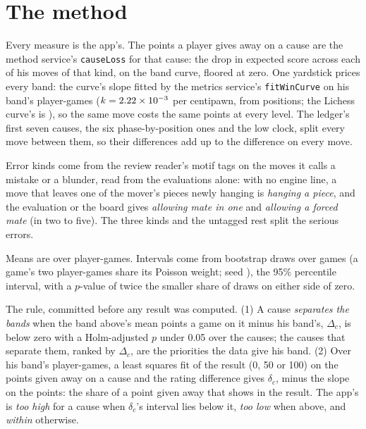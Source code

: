 \documentclass[11pt]{article}
\begin{document}
\begin{table}[h]
\centering
\small\BandTable
\caption{The bands. The slope is the band curve's, fitted on the band's own player-games; plies
are a game's mean length.}
\label{tab:bands}
\end{table}

\section{The method}

Every measure is the app's. The points a player gives away on a cause are the method service's
\texttt{causeLoss} for that cause: the drop in expected score across each of his moves of that
kind, on the band curve, floored at zero. One yardstick prices every band: the curve's slope fitted
by the metrics service's \texttt{fitWinCurve} on his band's player-games ($k = 2.22 \times
10^{-3}$ per centipawn, from \YardstickPositions{} positions; the Lichess curve's is \LichessK),
so the same move costs the same points at every level. The ledger's first seven causes, the six
phase-by-position ones and the low clock, split every move between them, so their differences add
up to the difference on every move.

Error kinds come from the review reader's motif tags on the moves it calls a mistake or a blunder,
read from the evaluations alone: with no engine line, a move that leaves one of the mover's pieces
newly hanging is \emph{hanging a piece}, and the evaluation or the board gives \emph{allowing mate in
one} and \emph{allowing a forced mate} (in two to five). The three kinds and the untagged rest split
the serious errors.

Means are over player-games. Intervals come from \Draws{} bootstrap draws over games (a game's two
player-games share its Poisson weight; seed \Seed), the 95\% percentile interval, with a $p$-value
of twice the smaller share of draws on either side of zero.

The rule, committed before any result was computed. (1) A cause \emph{separates the bands} when the
band above's mean points a game on it minus his band's, $\Delta_c$, is below zero with a
Holm-adjusted $p$ under 0.05 over the \Causes{} causes; the causes that separate them, ranked by
$\Delta_c$, are the priorities the data give his band. (2) Over his band's player-games, a least
squares fit of the result (0, 50 or 100) on the points given away on a cause and the rating
difference gives $\delta_c$, minus the slope on the points: the share of a point given away that
shows in the result. The app's \Discount{} is \emph{too high} for a cause when $\delta_c$'s interval
lies below it, \emph{too low} when above, and \emph{within} otherwise.
\end{document}
